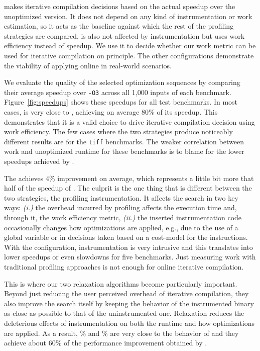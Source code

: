 \OracleRM makes iterative compilation decisions based on the actual speedup over the unoptimized version. It does not depend on any kind of
instrumentation or work estimation, so it acts as the baseline against which the rest of the profiling strategies are compared. \OraclePP
is also not affected by instrumentation but uses work efficiency instead of speedup. We use it to decide whether our work metric can be
used for iterative compilation on principle. The other configurations demonstrate the viability of applying online {\itercomp} in
real-world scenarios.

We evaluate the quality of the selected optimization sequences by comparing their average speedup over \texttt{-O3} across all 1,000 inputs
of each benchmark.
Figure~\ref{fig:speedups} shows these speedups for all test benchmarks. In most cases, \OraclePP is very close to \OracleRM, achieving on
average 80\% of its speedup. This demonstrates that it is a valid choice to drive iterative compilation decision using work efficiency. The
few cases where the two strategies produce noticeably different results are for the \texttt{tiff} benchmarks. The weaker correlation between
work and unoptimized runtime for these benchmarks is to blame for the lower speedups achieved by \OraclePP.

The \OptProf achieves 4\% improvement on average, which represents a little bit more that half of the speedup of \OraclePP. The culprit is
the one thing that is different between the two strategies, the profiling instrumentation. It affects the search in two key ways:
\textit{(i.)} the overhead incurred by profiling affects the execution time and, through it, the work efficiency metric,
\textit{(ii.)} the inserted instrumentation code occasionally changes how optimizations are applied, e.g., due to the use of a global
variable or in decisions taken based on a cost-model for the instructions. With the \OptProf configuration, instrumentation is very
intrusive and this translates into lower speedups or even slowdowns for five benchmarks. Just measuring work with traditional profiling
approaches is not enough for online iterative compilation.

This is where our two relaxation algorithms become particularly important. Beyond just reducing the user perceived overhead of iterative
compilation, they also improve the search itself by keeping the behavior of the instrumented binary as close as possible to that of the
uninstrumented one. Relaxation reduces the deleterious effects of instrumentation on both the runtime and how optimizations are applied.
As a result, \% and \% are very close to the behavior of \OraclePP and they achieve about 60\% of the performance
improvement obtained by \OracleRM.

